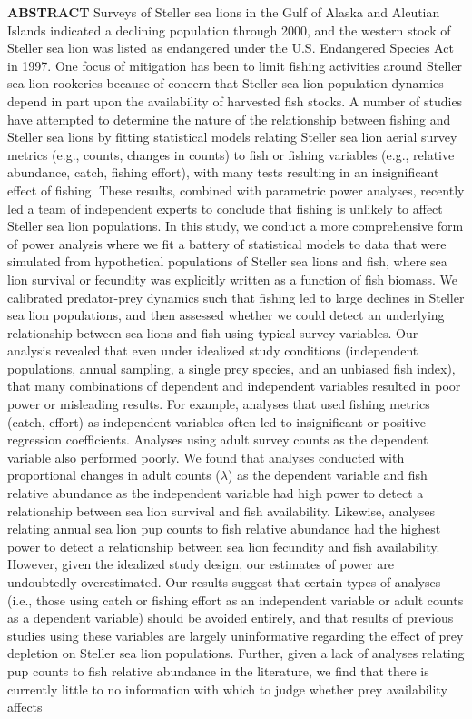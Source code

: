 \documentclass[11pt]{article}
\begin{document}
{\bf ABSTRACT} %
\large
Surveys of Steller sea lions in the Gulf of Alaska and Aleutian Islands indicated a declining population through 2000, and the western stock of Steller sea lion was listed as endangered under the U.S. Endangered Species Act in 1997.  One focus of mitigation has been to limit fishing activities around Steller sea lion rookeries because of concern that Steller sea lion population dynamics depend in part upon the availability of harvested fish stocks. A
number of studies have attempted to determine the nature of the relationship between fishing and Steller sea lions by fitting statistical models relating Steller sea lion aerial survey metrics (e.g., counts, changes in counts) to fish or fishing variables (e.g., relative abundance, catch, fishing effort), with many tests resulting in an insignificant effect of fishing.  These results, combined with parametric power analyses, recently led a team of independent experts \citep[e.g.,][]{Bernard:2011dq} to conclude that fishing is unlikely to affect Steller sea lion populations.  In this study, we conduct a more comprehensive form of power analysis where we fit a battery of statistical models to data that were simulated from hypothetical populations of Steller sea lions and fish, where sea lion survival or fecundity was explicitly written as a function of fish biomass.  We calibrated predator-prey dynamics such that fishing led to large declines in Steller sea lion populations, and then assessed whether we could detect an underlying relationship between sea lions and fish using typical survey variables.  Our analysis revealed that even under idealized study conditions (independent populations, annual sampling, a single prey species, and an unbiased fish index), that many combinations of dependent and independent variables resulted in poor power or misleading results.  For example, analyses that used fishing metrics (catch, effort) as independent variables often led to insignificant or positive regression coefficients.  Analyses using adult survey counts as the dependent variable also performed poorly.  We found that analyses conducted with proportional changes in adult counts ($\lambda$) as the dependent variable and fish relative abundance as the independent variable had high power to detect a relationship between sea lion survival and fish availability. Likewise, analyses relating annual sea lion pup counts to fish relative abundance had the highest power to detect a relationship between sea lion fecundity and fish availability. However, given the idealized study design, our estimates of power are undoubtedly overestimated.  Our results suggest that certain types of analyses (i.e., those using catch or fishing effort as an independent variable or adult counts as a dependent variable) should be avoided entirely, and that results of previous studies using these variables are largely uninformative regarding the effect of prey depletion on Steller sea lion populations.  Further, given a lack of analyses relating pup counts to fish relative abundance in the literature, we find that there is currently little to no information with which to judge whether prey availability affects 
\end{document}
